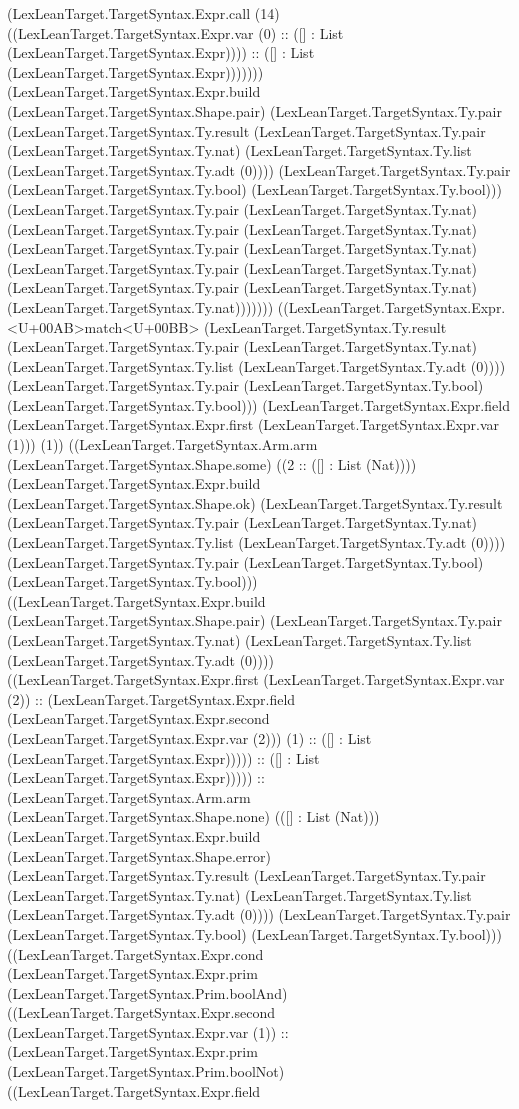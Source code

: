\documentclass[11pt]{article}
\begin{document}
(LexLeanTarget.TargetSyntax.Expr.call (14) ((LexLeanTarget.TargetSyntax.Expr.var (0) :: ([] : List (LexLeanTarget.TargetSyntax.Expr)))) :: ([] : List (LexLeanTarget.TargetSyntax.Expr))))))) (LexLeanTarget.TargetSyntax.Expr.build (LexLeanTarget.TargetSyntax.Shape.pair) (LexLeanTarget.TargetSyntax.Ty.pair (LexLeanTarget.TargetSyntax.Ty.result (LexLeanTarget.TargetSyntax.Ty.pair (LexLeanTarget.TargetSyntax.Ty.nat) (LexLeanTarget.TargetSyntax.Ty.list (LexLeanTarget.TargetSyntax.Ty.adt (0)))) (LexLeanTarget.TargetSyntax.Ty.pair (LexLeanTarget.TargetSyntax.Ty.bool) (LexLeanTarget.TargetSyntax.Ty.bool))) (LexLeanTarget.TargetSyntax.Ty.pair (LexLeanTarget.TargetSyntax.Ty.nat) (LexLeanTarget.TargetSyntax.Ty.pair (LexLeanTarget.TargetSyntax.Ty.nat) (LexLeanTarget.TargetSyntax.Ty.pair (LexLeanTarget.TargetSyntax.Ty.nat) (LexLeanTarget.TargetSyntax.Ty.pair (LexLeanTarget.TargetSyntax.Ty.nat) (LexLeanTarget.TargetSyntax.Ty.pair (LexLeanTarget.TargetSyntax.Ty.nat) (LexLeanTarget.TargetSyntax.Ty.nat))))))) ((LexLeanTarget.TargetSyntax.Expr.<U+00AB>match<U+00BB> (LexLeanTarget.TargetSyntax.Ty.result (LexLeanTarget.TargetSyntax.Ty.pair (LexLeanTarget.TargetSyntax.Ty.nat) (LexLeanTarget.TargetSyntax.Ty.list (LexLeanTarget.TargetSyntax.Ty.adt (0)))) (LexLeanTarget.TargetSyntax.Ty.pair (LexLeanTarget.TargetSyntax.Ty.bool) (LexLeanTarget.TargetSyntax.Ty.bool))) (LexLeanTarget.TargetSyntax.Expr.field (LexLeanTarget.TargetSyntax.Expr.first (LexLeanTarget.TargetSyntax.Expr.var (1))) (1)) ((LexLeanTarget.TargetSyntax.Arm.arm (LexLeanTarget.TargetSyntax.Shape.some) ((2 :: ([] : List (Nat)))) (LexLeanTarget.TargetSyntax.Expr.build (LexLeanTarget.TargetSyntax.Shape.ok) (LexLeanTarget.TargetSyntax.Ty.result (LexLeanTarget.TargetSyntax.Ty.pair (LexLeanTarget.TargetSyntax.Ty.nat) (LexLeanTarget.TargetSyntax.Ty.list (LexLeanTarget.TargetSyntax.Ty.adt (0)))) (LexLeanTarget.TargetSyntax.Ty.pair (LexLeanTarget.TargetSyntax.Ty.bool) (LexLeanTarget.TargetSyntax.Ty.bool))) ((LexLeanTarget.TargetSyntax.Expr.build (LexLeanTarget.TargetSyntax.Shape.pair) (LexLeanTarget.TargetSyntax.Ty.pair (LexLeanTarget.TargetSyntax.Ty.nat) (LexLeanTarget.TargetSyntax.Ty.list (LexLeanTarget.TargetSyntax.Ty.adt (0)))) ((LexLeanTarget.TargetSyntax.Expr.first (LexLeanTarget.TargetSyntax.Expr.var (2)) :: (LexLeanTarget.TargetSyntax.Expr.field (LexLeanTarget.TargetSyntax.Expr.second (LexLeanTarget.TargetSyntax.Expr.var (2))) (1) :: ([] : List (LexLeanTarget.TargetSyntax.Expr))))) :: ([] : List (LexLeanTarget.TargetSyntax.Expr))))) :: (LexLeanTarget.TargetSyntax.Arm.arm (LexLeanTarget.TargetSyntax.Shape.none) (([] : List (Nat))) (LexLeanTarget.TargetSyntax.Expr.build (LexLeanTarget.TargetSyntax.Shape.error) (LexLeanTarget.TargetSyntax.Ty.result (LexLeanTarget.TargetSyntax.Ty.pair (LexLeanTarget.TargetSyntax.Ty.nat) (LexLeanTarget.TargetSyntax.Ty.list (LexLeanTarget.TargetSyntax.Ty.adt (0)))) (LexLeanTarget.TargetSyntax.Ty.pair (LexLeanTarget.TargetSyntax.Ty.bool) (LexLeanTarget.TargetSyntax.Ty.bool))) ((LexLeanTarget.TargetSyntax.Expr.cond (LexLeanTarget.TargetSyntax.Expr.prim (LexLeanTarget.TargetSyntax.Prim.boolAnd) ((LexLeanTarget.TargetSyntax.Expr.second (LexLeanTarget.TargetSyntax.Expr.var (1)) :: (LexLeanTarget.TargetSyntax.Expr.prim (LexLeanTarget.TargetSyntax.Prim.boolNot) ((LexLeanTarget.TargetSyntax.Expr.field 
\end{document}
